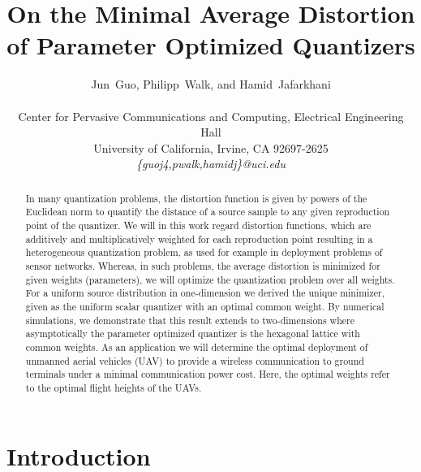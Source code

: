\documentclass[smallabstract,smallcaptions]{dccpaper}
\newcounter{example}[section]
\begin{document}
%
\title{On the Minimal Average Distortion of Parameter Optimized Quantizers}



\author{Jun~Guo, Philipp~Walk, and Hamid~Jafarkhani\\
  {\small\hspace{-0.5cm}\begin{minipage}{\textwidth}
\begin{tabular}{c}
Center for Pervasive Communications and Computing, Electrical Engineering Hall  \\
University of California, Irvine, CA 92697-2625 \\
{\it\{guoj4,pwalk,hamidj\}@uci.edu}
\end{tabular}
\end{minipage}}
}

\maketitle
\begin{abstract}
  In many quantization problems, the distortion function is given by powers of the Euclidean norm to quantify the distance of a
  source sample to any given reproduction point of the quantizer. We will in this work regard distortion functions,
  which are additively and multiplicatively weighted for each reproduction point resulting in a heterogeneous quantization problem, as
  used for example in deployment problems of sensor networks. Whereas, in such problems, the average distortion is
  minimized for given weights (parameters), we will optimize the quantization problem over all weights.  For a uniform source
  distribution in one-dimension we derived the unique minimizer, given as the uniform scalar quantizer with an optimal
  common weight. By numerical simulations, we demonstrate that this result extends to two-dimensions where
  asymptotically the parameter optimized quantizer is the hexagonal lattice with common weights. As an application we
  will determine the optimal deployment of unmanned aerial vehicles (UAV) to provide a wireless communication to ground
  terminals under a minimal communication power cost. Here, the optimal weights refer to the optimal flight heights of the
  UAVs.
\end{abstract}
%
\section{Introduction}
\end{document}
